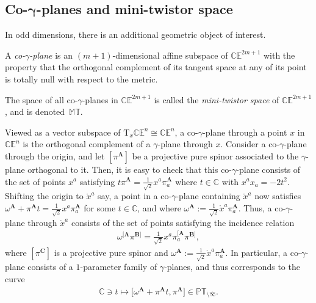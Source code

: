 \documentclass[10pt,a4paper]{amsart}
\numberwithin{equation}{section}
\newcommand{\mbf} [1]{\mathbf{#1}}
\newcommand{\mr}[1] {\mathring{#1}}
\newcommand{\Tgt} {\mathrm{T}}
\newcommand{\PT} {\mathbb{PT}}
\newcommand{\T} {\mathbb{T}}
\newcommand{\E} {\mathbb{E}}
\newcommand{\M} {\mathbb{M}}
\newcommand{\C} {\mathbb{C}}
\begin{document}
\subsection[Co-gamma-planes and mini-twistor space]{Co-$\boldsymbol{\gamma}$-planes and mini-twistor space}\label{sec-co-gam}
In odd dimensions, there is an additional geometric object of interest.
\begin{Definition}\label{defn-co-null-plane}
A \emph{co-$\gamma$-plane} is an $(m+1)$-dimensional af\/f\/ine subspace of $\C\E^{2m+1}$ with the property that the orthogonal complement of its tangent space at any of its point is totally null with respect to the metric.

The space of all co-$\gamma$-planes in $\C\E^{2m+1}$ is called the \emph{mini-twistor space} of $\C\E^{2m+1}$, and is denoted~$\M\T$.
\end{Definition}

Viewed as a vector subspace of $\Tgt_x \C \E^n \cong \C \E^n$, a co-$\gamma$-plane through a point $x$ in $\C \E^n$ is the orthogonal complement of a $\gamma$-plane through $x$. Consider a co-$\gamma$-plane through the origin, and let $[\pi^{\mbf{A}}]$ be a projective pure spinor associated to the $\gamma$-plane orthogonal to it. Then, it is easy to check that this co-$\gamma$-plane consists of the set of points $x^a$ satisfying $t \pi^{\mbf{A}} = \frac{1}{\sqrt{2}} x^a \pi_a^{\mbf{A}}$ where $t \in \C$ with $x^a x_a = -2 t^2$. Shifting the origin to $\mr{x}^a$ say, a point in a co-$\gamma$-plane containing $\mr{x}^a$ now satisf\/ies $\omega^{\mbf{A}} + \pi^{\mbf{A}} t = \frac{1}{\sqrt{2}} x^a \pi_a^{\mbf{A}}$ for some $t \in \C$, and where $\omega^{\mbf{A}} := \frac{1}{\sqrt{2}} \mr{x}^a \pi_a^{\mbf{A}}$. Thus, a co-$\gamma$-plane through $\mr{x}^a$ consists of the set of points satisfying the incidence relation
\begin{gather}\label{eq-incidence-co-null}
\omega^{[\mbf{A}} \pi^{\mbf{B}]} = \tfrac{1}{\sqrt{2}} x^a \pi_a^{[\mbf{A}} \pi^{\mbf{B}]} ,
\end{gather}
where $[\pi^{\mbf{C}}]$ is a projective pure spinor and $\omega^{\mbf{A}} := \frac{1}{\sqrt{2}} \mr{x}^a \pi_a^{\mbf{A}}$. In particular, a co-$\gamma$-plane consists of a $1$-parameter family of $\gamma$-planes, and thus corresponds to the curve
\begin{gather}\label{eq-MT-PT-curve}
\C \ni t \mapsto \big[\omega^{\mbf{A}} + \pi^{\mbf{A}} t , \pi^{\mbf{A}} \big] \in \PT_{\setminus \widehat{\infty}} .
\end{gather}
\end{document}
